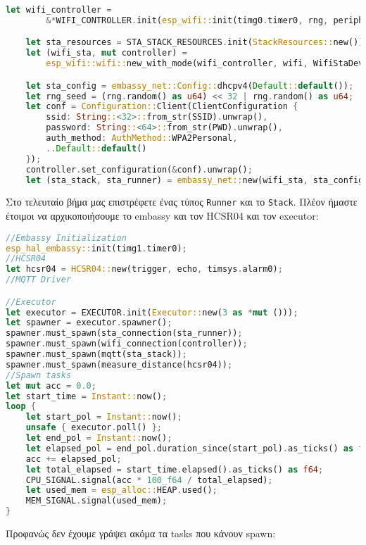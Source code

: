 \begin{lstlisting}[language=Rust]
    let wifi_controller =
        &*WIFI_CONTROLLER.init(esp_wifi::init(timg0.timer0, rng, peripherals.RADIO_CLK).unwrap());

    let sta_resources = STA_STACK_RESOURCES.init(StackResources::new());
    let (wifi_sta, mut controller) =
        esp_wifi::wifi::new_with_mode(wifi_controller, wifi, WifiStaDevice).unwrap();

    let sta_config = embassy_net::Config::dhcpv4(Default::default());
    let rng_seed = (rng.random() as u64) << 32 | rng.random() as u64;
    let conf = Configuration::Client(ClientConfiguration {
        ssid: String::<32>::from_str(SSID).unwrap(),
        password: String::<64>::from_str(PWD).unwrap(),
        auth_method: AuthMethod::WPA2Personal,
        ..Default::default()
    });
    controller.set_configuration(&conf).unwrap();
    let (sta_stack, sta_runner) = embassy_net::new(wifi_sta, sta_config, sta_resources, rng_seed);
\end{lstlisting}

Στο τελευταίο βήμα μας επιστρέφετε ένας τύπος \verb|Runner| και το \verb|Stack|. Πλέον ήμαστε έτοιμοι
να αρχικοποιήσουμε το embassy και τον HCSR04 και τον executor:

\begin{lstlisting}[language=Rust]
//Embassy Initialization
esp_hal_embassy::init(timg1.timer0);
//HCSR04
let hcsr04 = HCSR04::new(trigger, echo, timsys.alarm0);
//MQTT Driver

//Executor
let executor = EXECUTOR.init(Executor::new(3 as *mut ()));
let spawner = executor.spawner();
spawner.must_spawn(sta_connection(sta_runner));
spawner.must_spawn(wifi_connection(controller));
spawner.must_spawn(mqtt(sta_stack));
spawner.must_spawn(measure_distance(hcsr04));
//Spawn tasks
let mut acc = 0.0;
let start_time = Instant::now();
loop {
    let start_pol = Instant::now();
    unsafe { executor.poll() };
    let end_pol = Instant::now();
    let elapsed_pol = end_pol.duration_since(start_pol).as_ticks() as f64;
    acc += elapsed_pol;
    let total_elapsed = start_time.elapsed().as_ticks() as f64;
    CPU_SIGNAL.signal(acc * 100_f64 / total_elapsed);
    let used_mem = esp_alloc::HEAP.used();
    MEM_SIGNAL.signal(used_mem);
}
\end{lstlisting}

Προφανώς δεν έχουμε γράψει ακόμα τα tasks που κάνουν spawn:

